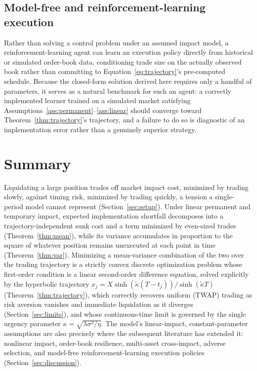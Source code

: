 \documentclass[11pt]{article}
\theoremstyle{remark}
\theoremstyle{definition}
\begin{document}
\subsection{Model-free and reinforcement-learning execution}
Rather than solving a control problem under an assumed impact model, a reinforcement-learning agent can learn an execution policy directly from historical or simulated order-book data, conditioning trade size on the actually observed book rather than committing to Equation~\eqref{eq:trajectory}'s pre-computed schedule. Because the closed-form solution derived here requires only a handful of parameters, it serves as a natural benchmark for such an agent: a correctly implemented learner trained on a simulated market satisfying Assumptions~\ref{ass:permanent}--\ref{ass:linear} should converge toward Theorem~\ref{thm:trajectory}'s trajectory, and a failure to do so is diagnostic of an implementation error rather than a genuinely superior strategy.

\section{Summary}
\label{sec:summary}

Liquidating a large position trades off market impact cost, minimized by trading slowly, against timing risk, minimized by trading quickly, a tension a single-period model cannot represent (Section~\ref{sec:setup}). Under linear permanent and temporary impact, expected implementation shortfall decomposes into a trajectory-independent sunk cost and a term minimized by even-sized trades (Theorem~\ref{thm:mean}), while its variance accumulates in proportion to the square of whatever position remains unexecuted at each point in time (Theorem~\ref{thm:var}). Minimizing a mean-variance combination of the two over the trading trajectory is a strictly convex discrete optimization problem whose first-order condition is a linear second-order difference equation, solved explicitly by the hyperbolic trajectory $x_j=X\sinh(\tilde\kappa(T-t_j))/\sinh(\tilde\kappa T)$ (Theorem~\ref{thm:trajectory}), which correctly recovers uniform (TWAP) trading as risk aversion vanishes and immediate liquidation as it diverges (Section~\ref{sec:limits}), and whose continuous-time limit is governed by the single urgency parameter $\kappa=\sqrt{\lambda\sigma^2/\eta}$. The model's linear-impact, constant-parameter assumptions are also precisely where the subsequent literature has extended it: nonlinear impact, order-book resilience, multi-asset cross-impact, adverse selection, and model-free reinforcement-learning execution policies (Section~\ref{sec:discussion}).
\end{document}

